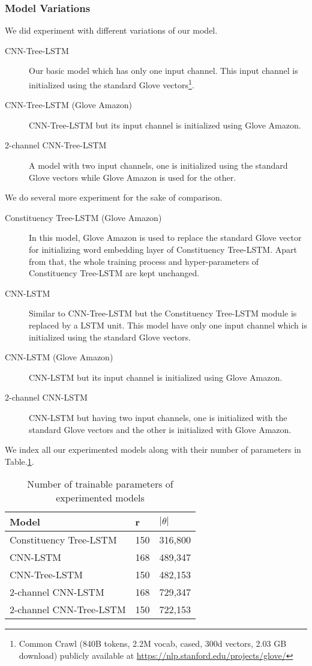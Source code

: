 \subsubsection{Model Variations}
We did experiment with different variations of our model.
\begin{description}
	\item[CNN-Tree-LSTM] Our basic model which has only one input channel. 
	This input channel is initialized using the standard Glove vectors\footnote{Common Crawl (840B tokens, 2.2M vocab, cased, 300d vectors, 2.03 GB download) publicly available at \url{https://nlp.stanford.edu/projects/glove/}}.
	\item[CNN-Tree-LSTM (Glove Amazon)] CNN-Tree-LSTM but its input channel is initialized using Glove Amazon.
	\item [2-channel CNN-Tree-LSTM] A model with two input channels, one is initialized using the standard Glove vectors while Glove Amazon is used for the other.
\end{description}
We do several more experiment for the sake of comparison.
\begin{description}
	\item[Constituency Tree-LSTM (Glove Amazon)] In this model, Glove Amazon is used to replace the standard Glove vector for initializing word embedding layer of Constituency Tree-LSTM.
	Apart from that, the whole training process and hyper-parameters of Constituency Tree-LSTM are kept unchanged.
	\item[CNN-LSTM] Similar to CNN-Tree-LSTM but the Constituency Tree-LSTM module is replaced by a LSTM unit.
	This model have only one input channel which is initialized using the standard Glove vectors.
	\item [CNN-LSTM (Glove Amazon)] CNN-LSTM but its input channel is initialized using Glove Amazon.
	\item [2-channel CNN-LSTM] CNN-LSTM but having two input channels, one is initialized with the standard Glove vectors and the other is initialized with Glove Amazon.
\end{description}
We index all our experimented models along with their number of parameters in Table.\ref{table:paramtable}.
\begin{table}[H]
	\centering
	\caption{Number of trainable parameters of experimented models}
	\label{table:paramtable}
	\begin{tabular}{lll}
		Model & r & \(\left\vert{\theta}\right\vert\) \\ \hline
		Constituency Tree-LSTM   & 150         & 316,800          \\
		CNN-LSTM                 & 168         & 489,347          \\
		CNN-Tree-LSTM            & 150         & 482,153          \\
		2-channel CNN-LSTM       & 168         & 729,347          \\
		2-channel CNN-Tree-LSTM  & 150         & 722,153
	\end{tabular}
\end{table}
